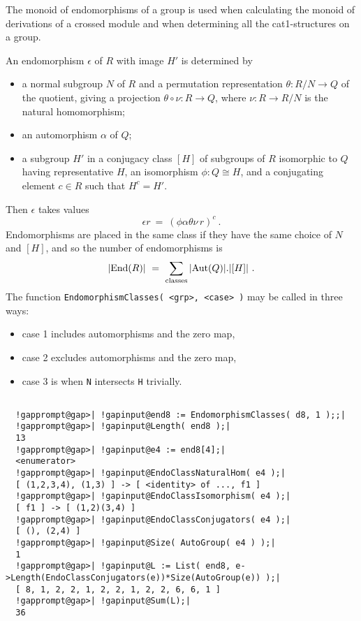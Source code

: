 \documentclass[a4paper,11pt]{report}
\begin{document}
{{{ The monoid of endomorphisms of a group is used when calculating the monoid of
derivations of a crossed module and when determining all the cat1-structures
on a group. 

 An endomorphism $\epsilon$ of $R$ with image $H'$ is determined by 
\begin{itemize}
\item  a normal subgroup $N$ of $R$ and a permutation representation $\theta : R/N \to Q$ of the quotient, giving a projection $\theta \circ \nu : R \to Q$, where $\nu : R \to R/N$ is the natural homomorphism; 
\item  an automorphism $\alpha$ of $Q$; 
\item  a subgroup $H'$ in a conjugacy class $[H]$ of subgroups of $R$ isomorphic to $Q$ having representative $H$, an isomorphism $\phi : Q \cong H$, and a conjugating element $c \in R$ such that $H^c = H'$. 
\end{itemize}
 

 Then $\epsilon$ takes values 
\[ \epsilon r ~=~ (\phi\alpha\theta\nu\,r)^c~. \]
 Endomorphisms are placed in the same class if they have the same choice of $N$ and $[H]$, and so the number of endomorphisms is 
\[ |{\rm End}(R)| ~=~ \sum_{{\rm classes}} |{\rm Aut}(Q)|.|[H]|~. \]
 The function \texttt{EndomorphismClasses( {\textless}grp{\textgreater},
{\textless}case{\textgreater} )} may be called in three ways: 
\begin{itemize}
\item  case 1 includes automorphisms and the zero map, 
\item  case 2 excludes automorphisms and the zero map, 
\item  case 3 is when \texttt{N} intersects \texttt{H} trivially. 
\end{itemize}
 }

 
\begin{Verbatim}[commandchars=!@|,fontsize=\small,frame=single,label=Example]
  
  !gapprompt@gap>| !gapinput@end8 := EndomorphismClasses( d8, 1 );;|
  !gapprompt@gap>| !gapinput@Length( end8 );|
  13
  !gapprompt@gap>| !gapinput@e4 := end8[4];|
  <enumerator>
  !gapprompt@gap>| !gapinput@EndoClassNaturalHom( e4 );|
  [ (1,2,3,4), (1,3) ] -> [ <identity> of ..., f1 ]
  !gapprompt@gap>| !gapinput@EndoClassIsomorphism( e4 );|
  [ f1 ] -> [ (1,2)(3,4) ]
  !gapprompt@gap>| !gapinput@EndoClassConjugators( e4 );|
  [ (), (2,4) ]
  !gapprompt@gap>| !gapinput@Size( AutoGroup( e4 ) );|
  1
  !gapprompt@gap>| !gapinput@L := List( end8, e->Length(EndoClassConjugators(e))*Size(AutoGroup(e)) );|
  [ 8, 1, 2, 2, 1, 2, 2, 1, 2, 2, 6, 6, 1 ]
  !gapprompt@gap>| !gapinput@Sum(L);|
  36
  

\end{Verbatim}}}
\end{document}
